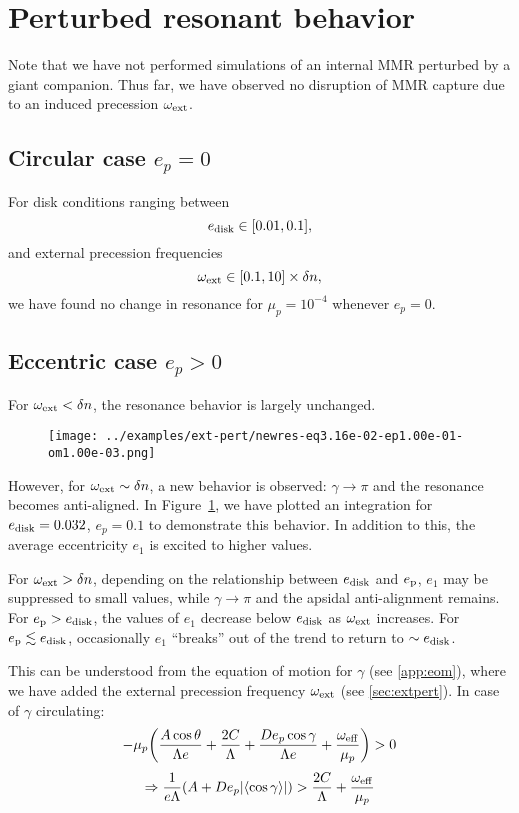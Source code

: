 \documentclass{article}
\newcommand{\edisk}{e_{\rm disk}}
\newcommand{\omext}{\omega_{\rm ext}}
\newcommand{\ep}{e_{\rm p}}
\DeclarePairedDelimiter{\abs}{|}{|}
\DeclarePairedDelimiter{\p}{(}{)}
\begin{document}
\section{Perturbed resonant behavior}
Note that we have not performed simulations
of an internal MMR perturbed by a giant companion.
Thus far, we have observed no disruption of MMR capture due to an
induced precession $\omext$.

\subsection{Circular case $e_p = 0$}
For disk conditions ranging between $$\edisk\in [0.01,0.1],$$ and
external precession frequencies
$$\omext \in [0.1,10]\times\delta n,$$ we have
found no change in resonance for $\mu_p = 10^{-4}$
whenever $e_p = 0$.

\subsection{Eccentric case $e_p > 0$}
For $\omext < \delta n$, the resonance behavior is largely unchanged.

\begin{figure}[htb]
  \centering
  \texttt{[image: ../examples/ext-pert/newres-eq3.16e-02-ep1.00e-01-om1.00e-03.png]}
  \caption{ }
  \label{fig:newres}
\end{figure}

However, for $\omext \sim \delta n$, a new behavior is observed:
$\gamma\to \pi$ and the resonance becomes anti-aligned. In Figure~\ref{fig:newres}, we have
plotted an integration for $\edisk=0.032$, $e_p=0.1$ to demonstrate
this behavior.  In addition to this, the average eccentricity $e_1$ is
excited to higher values.

For $\omext > \delta n$, depending on the relationship between
$\edisk$ and $\ep$, $e_1$ may be suppressed to small values, while
$\gamma\to \pi$ and the apsidal anti-alignment remains. For
$\ep>\edisk$, the values of $e_1$ decrease below $\edisk$ as $\omext$
increases. For $\ep \lesssim \edisk$, occasionally $e_1$ ``breaks''
out of the trend to return to $\sim \edisk$.

This can be understood from the equation of motion for $\gamma$ (see \ref{app:eom}),
where we have added the external precession frequency $\omext$ (see \ref{sec:extpert}).
In case of $\gamma$ circulating:
\[ -\mu_p\p*{\frac{A\cos\theta}{\Lambda e} + \frac{2C}{\Lambda} +
    \frac{De_p\cos\gamma}{\Lambda e} + \frac{\omega_{\rm eff}}{\mu_p}}
  > 0 \]
\[\Rightarrow \frac{1}{e\Lambda}\p*{A+De_p\abs{\left<\cos\gamma\right>}} > \frac{2C}{\Lambda} + \frac{\omega_{\rm eff}}{\mu_p} \]
\end{document}
